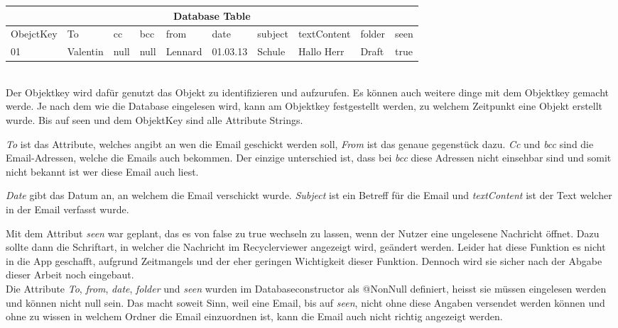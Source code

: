 \documentclass[a4paper,11pt]{article}
\begin{document}
\begin{tabular}{ |p{1.6cm}  |p{1.1cm} |p{1.1cm} |p{1.05cm} |p{1.15cm} |p{1.15cm} |p{1.25cm} |p{1.75cm} |p{1.25cm} |p{1.15cm}|}
 \hline
 \multicolumn{10}{|c|}{Database Table} \\
 \hline
    ObejctKey &To & cc & bcc & from & date & subject & textContent & folder & seen  \\
 \hline
     01    &Valentin& null & null & Lennard & 01.03.13 & Schule &  Hallo Herr & Draft & true \\
 \hline
\end{tabular} \\

Der Objektkey wird dafür genutzt das Objekt zu identifizieren und aufzurufen. Es können auch weitere dinge mit dem Objektkey gemacht werde. 
Je nach dem wie die Database eingelesen wird, kann am Objektkey festgestellt werden, zu welchem Zeitpunkt eine Objekt erstellt wurde. Bis auf seen und dem ObjektKey sind 
alle Attribute Strings. 

\textit{To} ist das Attribute, welches angibt an wen die Email geschickt werden soll, \textit{From} ist das genaue gegenstück dazu. \textit{Cc} und \textit{bcc} sind die 
Email-Adressen, welche die Emails auch bekommen. Der einzige unterschied ist, dass bei \textit{bcc} diese Adressen nicht einsehbar sind und somit nicht bekannt ist wer diese Email auch liest. 

\textit{Date} gibt das Datum an, an welchem die Email verschickt wurde. \textit{Subject} ist ein Betreff für die Email und \textit{textContent} ist der Text welcher in der Email verfasst wurde. 

Mit dem Attribut \textit{seen} war geplant, das es von false zu true wechseln zu lassen, wenn der Nutzer eine ungelesene Nachricht öffnet. Dazu sollte dann die Schriftart,
in welcher die Nachricht im Recyclerviewer angezeigt wird, geändert werden. Leider hat diese Funktion es nicht in die App geschafft, aufgrund Zeitmangels und der eher 
geringen Wichtigkeit dieser Funktion. Dennoch wird sie sicher nach der Abgabe dieser Arbeit noch eingebaut. \\

Die Attribute \textit{To}, \textit{from}, \textit{date}, \textit{folder} und \textit{seen} wurden im Databaseconstructor als @NonNull definiert, heisst sie müssen eingelesen werden und können 
nicht null sein. Das macht soweit Sinn, weil eine Email, bis auf \textit{seen}, nicht ohne diese Angaben versendet werden können und ohne zu wissen in welchem Ordner die Email einzuordnen ist,
kann die Email auch nicht richtig angezeigt werden. \\
\end{document}
